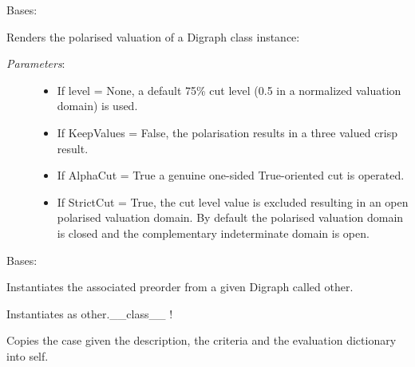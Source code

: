 \documentclass[letterpaper,10pt,english]{sphinxmanual}
\begin{document}
\begin{fulllineitems}
\label{techDoc:digraphs.PolarisedDigraph}
Bases: {\hyperref[techDoc:digraphs.Digraph]{\emph{}}}

Renders the polarised valuation of a Digraph class instance:
\begin{description}
\item[{\emph{Parameters}:}] \leavevmode\begin{itemize}
\item {} 
If level = None, a default 75\% cut level (0.5 in a normalized valuation domain) is used.

\item {} 
If KeepValues = False, the polarisation results in  a three valued crisp result.

\item {} 
If AlphaCut = True a genuine one-sided True-oriented cut is operated.

\item {} 
If StrictCut = True, the cut level value is excluded resulting in an open polarised valuation domain.
By default the polarised valuation domain is closed and the complementary indeterminate domain is open.

\end{itemize}

\end{description}

\end{fulllineitems}


\begin{fulllineitems}
\label{techDoc:digraphs.Preorder}
Bases: {\hyperref[techDoc:digraphs.Digraph]{\emph{}}}

Instantiates the associated preorder from
a given Digraph called other.

Instantiates as other.\_\_class\_\_ !

Copies the case given the description, the criteria
and the evaluation dictionary into self.

\end{fulllineitems}
\end{document}
